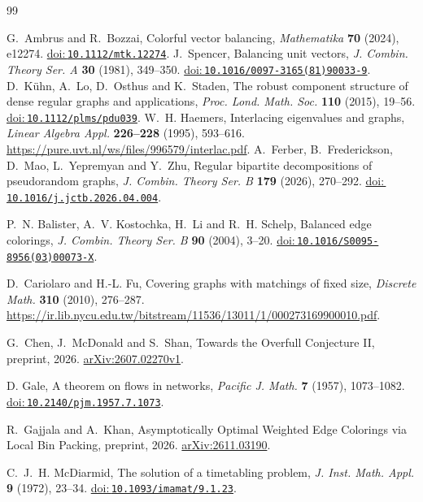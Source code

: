 \documentclass[11pt]{article}
\begin{document}
\begin{thebibliography}{99}
\small

 G.~Ambrus and R.~Bozzai, Colorful vector balancing, \emph{Mathematika} \textbf{70} (2024), e12274. \href{https://doi.org/10.1112/mtk.12274}{doi:\,\nolinkurl{10.1112/mtk.12274}}.
 J.~Spencer, Balancing unit vectors, \emph{J. Combin. Theory Ser. A} \textbf{30} (1981), 349--350. \href{https://doi.org/10.1016/0097-3165(81)90033-9}{doi:\,\nolinkurl{10.1016/0097-3165(81)90033-9}}.
 D.~K\"uhn, A.~Lo, D.~Osthus and K.~Staden, The robust component structure of dense regular graphs and applications, \emph{Proc. Lond. Math. Soc.} \textbf{110} (2015), 19--56. \href{https://doi.org/10.1112/plms/pdu039}{doi:\,\nolinkurl{10.1112/plms/pdu039}}.
 W.~H. Haemers, Interlacing eigenvalues and graphs, \emph{Linear Algebra Appl.} \textbf{226--228} (1995), 593--616. \url{https://pure.uvt.nl/ws/files/996579/interlac.pdf}.
 A.~Ferber, B.~Frederickson, D.~Mao, L.~Yepremyan and Y.~Zhu, Regular bipartite decompositions of pseudorandom graphs, \emph{J. Combin. Theory Ser. B} \textbf{179} (2026), 270--292. \href{https://doi.org/10.1016/j.jctb.2026.04.004}{doi:\,\nolinkurl{10.1016/j.jctb.2026.04.004}}.


P.~N. Balister, A.~V. Kostochka, H.~Li and R.~H. Schelp,
Balanced edge colorings,
\emph{J. Combin. Theory Ser. B} \textbf{90} (2004), 3--20.
\href{https://doi.org/10.1016/S0095-8956(03)00073-X}{doi:\,\nolinkurl{10.1016/S0095-8956(03)00073-X}}.

D.~Cariolaro and H.-L. Fu,
Covering graphs with matchings of fixed size,
\emph{Discrete Math.} \textbf{310} (2010), 276--287. \url{https://ir.lib.nycu.edu.tw/bitstream/11536/13011/1/000273169900010.pdf}.


G.~Chen, J.~McDonald and S.~Shan,
Towards the Overfull Conjecture II,
preprint, 2026.
\href{https://arxiv.org/abs/2607.02270v1}{arXiv:2607.02270v1}.

D. Gale, A theorem on flows in networks,
\emph{Pacific J. Math.} \textbf{7} (1957), 1073--1082.
\href{https://doi.org/10.2140/pjm.1957.7.1073}{doi:\,\nolinkurl{10.2140/pjm.1957.7.1073}}.

R.~Gajjala and A.~Khan,
Asymptotically Optimal Weighted Edge Colorings via Local Bin Packing,
preprint, 2026.
\href{https://arxiv.org/abs/2611.03190}{arXiv:2611.03190}.

C.~J.~H. McDiarmid,
The solution of a timetabling problem,
\emph{J. Inst. Math. Appl.} \textbf{9} (1972), 23--34.
\href{https://doi.org/10.1093/imamat/9.1.23}{doi:\,\nolinkurl{10.1093/imamat/9.1.23}}.


\end{thebibliography}
\end{document}
